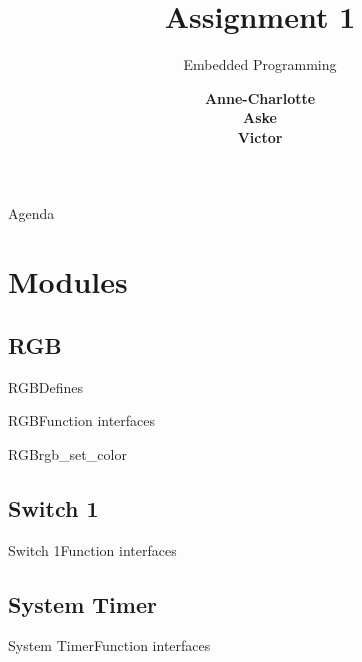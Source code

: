 \documentclass[aspectratio=169,10pt,t]{beamer}
\title{Assignment 1}
\subtitle{Embedded Programming}
\date{ }
\author{
  \textbf{
  Anne-Charlotte\\
  Aske\\
  Victor}
}
\institute[
  SDU Robotics\\
  The Maersk Mc-Kinney Moller Institute\\
  University of Southern Denmark
] %
{%
  SDU Robotics\\
  The Maersk Mc-Kinney Moller Institute\\
  University of Southern Denmark

}
\begin{document}
{\SDUwavesbg%
\begin{frame} %
  \titlepage
\end{frame}}

\begin{frame}{Agenda}{\vphantom{(y}}
\tableofcontents
\end{frame}


\section{Modules}%
\label{sec:modules}

\subsection{RGB}%
\label{sub:rgb}

\begin{frame}[t]{RGB}{Defines}
	
\end{frame}

\begin{frame}[t]{RGB}{Function interfaces}
	
\end{frame}

\begin{frame}[t]{RGB}{rgb\_set\_color}
	
\end{frame}


\subsection{Switch 1}%
\label{sub:switch_1}

\begin{frame}[t]{Switch 1}{Function interfaces}
	
\end{frame}


\subsection{System Timer}%
\label{sub:system_timer}

\begin{frame}[t]{System Timer}{Function interfaces}
	\only<1>{
	
	}
	\only<2>{
	
	}
\end{frame}
\end{document}
